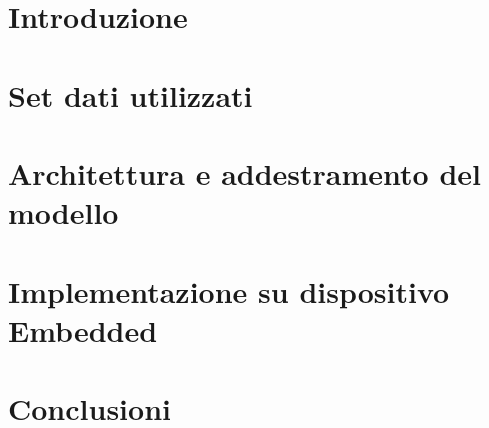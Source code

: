 \documentclass[12pt,a4paper]{book}
\begin{document}
    
    
    \tableofcontents
    
    \chapter*{Introduzione} 
    \label{CH:Intro}
    
    
    \chapter{Set dati utilizzati}
    \label{CH:Teoria}
    
    
    \chapter{Architettura e addestramento del modello}
    \label{CH:Val_num}
    
    
    \chapter{Implementazione su dispositivo Embedded}
    \label{CH:Val_num}
    
    
    \chapter{Conclusioni}
    \label{CH:Concl}
    
    
\end{document}
